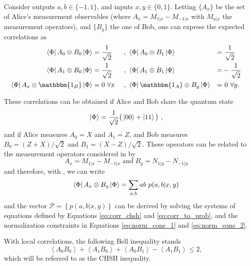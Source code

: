 Consider outputs $a,b \in \{-1,1\}$, and inputs $x,y \in \{0,1\}$. 
Letting $\{A_x\}$ be the set of Alice's measurement observables (where $A_x = M_{1|x} - M_{-1|x}$
with $M_{a|x}$ the measurement operators), and $\{B_y\}$ the one of Bob, one can express the
expected
correlations as
\begin{equation} 
\begin{aligned} 
    \bra{\Phi} A_0\otimes B_0 \ket{\Phi} & = \dfrac{1}{\sqrt{2}} &\ 
    ,\  & \bra{\Phi} A_0\otimes B_1 \ket{\Phi} & = &\ \dfrac{1}{\sqrt{2}}  \\ 
    \bra{\Phi} A_1\otimes B_0 \ket{\Phi} & = \dfrac{1}{\sqrt{2}} &\
    ,\  & \bra{\Phi} A_1\otimes B_1 \ket{\Phi} & = & - \dfrac{1}{\sqrt{2}}  \\ 
    \bra{\Phi} A_x\otimes \mathbbm{1_B} \ket{\Phi} & = 0\   \forall x &\ ,\  
    & \bra{\Phi} \mathbbm{1_A}\otimes B_y \ket{\Phi} & = & \ 0 \  \forall y \text{.}
\end{aligned} \label{eq:corr_chsh}
\end{equation}


These correlations can be obtained if Alice and Bob share the quantum state 
\begin{equation}
    \ket{\Phi} = \dfrac{1}{\sqrt{2}} \big( \ket{00} +\ket{11}\big) \text{ ,}
\end{equation} and if Alice measures $A_0 = X$ and $A_1 = Z$, and Bob measures $B_0 = (Z+X)/\sqrt{2}$ and $B_1 = (X-Z)/\sqrt{2} $.  These operators can be related to
the measurement operators considered in  by
\begin{equation}
    A_x = M_{1|x} - M_{-1|x} \; \text{and} \; B_y = N_{1|y} - N_{-1|y}
\end{equation} and therefore, with \Autoref{eq:qu_corr},  we can write
\begin{equation}
    \bra{\Phi} A_{x} \otimes B_{y} \ket{\Phi} = \sum_{a,b} ab \ p(a,b|x,y)
    \label{eq:corr_to_prob}
\end{equation}
and the vector $\mathcal P = \left\{ p(a,b|x,y)\right\}$ can be derived by solving
the systems of equations defined by Equations \ref{eq:corr_chsh} and
\ref{eq:corr_to_prob}, and the normalization constraints in
Equations \ref{eq:norm_cons_1} and \ref{eq:norm_cons_2}. 

With local correlations, the following Bell inequality stands \cite{bell_einstein_1964}
\begin{equation} \label{eq:chsh}
     \left< A_0 B_0\right> + \left< A_1 B_0\right> + \left< A_0 B_1 \right> - \left< A_1 B_1 \right>  \leq 2,
\end{equation} 
which will be referred to as the CHSH inequality.

